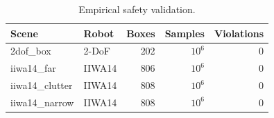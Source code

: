\begin{table}[t]
\centering
\caption{Empirical safety validation.}
\label{tab:soundness}
\scriptsize
\setlength{\tabcolsep}{3pt}
\begin{tabular}{@{}llrrr@{}}
\toprule
Scene & Robot & Boxes & Samples & Violations \\
\midrule
2dof\_box & 2-DoF & 202 & $10^6$ & 0 \\
iiwa14\_far & IIWA14 & 806 & $10^6$ & 0 \\
iiwa14\_clutter & IIWA14 & 808 & $10^6$ & 0 \\
iiwa14\_narrow & IIWA14 & 808 & $10^6$ & 0 \\
\bottomrule
\end{tabular}
\end{table}
